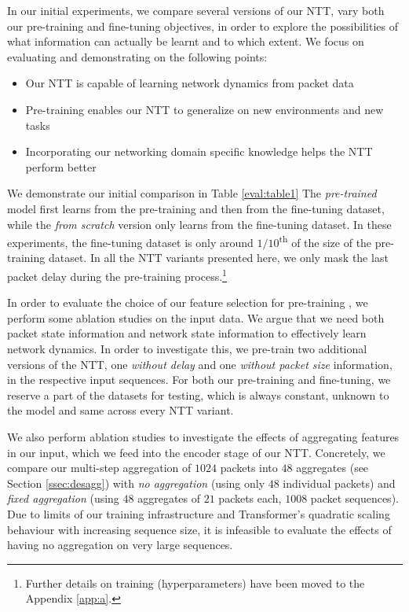 In our initial experiments, we compare several versions of our NTT, vary both our pre-training and fine-tuning objectives, in order to explore the possibilities of what information can actually be learnt and to which extent. We focus on evaluating and demonstrating on the following points:

\begin{itemize}
\item Our NTT is capable of learning network dynamics from packet data 
\item Pre-training enables our NTT to generalize on new environments and new tasks 
\item Incorporating our networking domain specific knowledge helps the NTT perform better
\end{itemize}

We demonstrate our initial comparison in Table \ref{eval:table1} The \emph{pre-trained} model first learns from the pre-training and then from the fine-tuning dataset, while the \emph{from scratch} version only learns from the fine-tuning dataset. In these experiments, the fine-tuning dataset is only around $1/10$\textsuperscript{th} of the size of the pre-training dataset. In all the NTT variants presented here, we only mask the last packet delay during the pre-training process.\footnote{Further details on training (\eg hyperparameters) have been moved to the Appendix \ref{app:a}.}

In order to evaluate the choice of our feature selection for pre-training , we perform some ablation studies on the input data. We argue that we need both packet state information and network state information to effectively learn network dynamics. In order to investigate this, we pre-train two additional versions of the NTT, one \emph{without delay} and one \emph{without packet size} information, in the respective input sequences. For both our pre-training and fine-tuning, we reserve a part of the datasets for testing, which is always constant, unknown to the model and same across every NTT variant.

We also perform ablation studies to investigate the effects of aggregating features in our input, which we feed into the encoder stage of our NTT. Concretely, we compare our multi-step aggregation of $1024$ packets into $48$ aggregates (see Section \ref{ssec:desagg}) with \emph{no aggregation} (using only $48$ individual packets) and \emph{fixed aggregation} (using $48 $ aggregates of $21$ packets each, \ie $1008$ packet sequences). Due to limits of our training infrastructure and Transformer's quadratic scaling behaviour with increasing sequence size, it is infeasible to evaluate the effects of having no aggregation on very large sequences.



